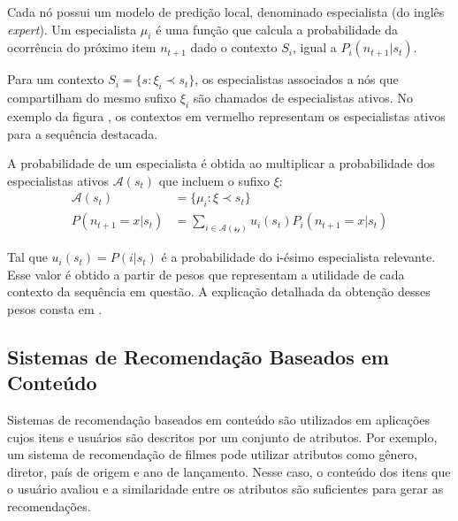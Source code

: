 Cada nó possui um modelo de predição local, denominado especialista (do inglês
\textit{expert}). Um especialista $\mu_i$ é uma função que calcula a
probabilidade da ocorrência do próximo item $n_{t+1}$ dado o contexto $S_i$, igual a
$P_i(n_{t+1} | s_t)$.

Para um contexto $S_i = \{s: \xi_i \prec s_t\}$, os especialistas associados a
nós que compartilham do mesmo sufixo $\xi_i$ são chamados de especialistas
ativos. No exemplo da figura \label{fig:context_tree}, os contextos em vermelho
representam os especialistas ativos para a sequência destacada.

A probabilidade de um especialista é obtida ao multiplicar a probabilidade dos
especialistas ativos $\mathcal{A}(s_t)$
 que incluem o sufixo $\xi$:
\begin{align}
    \mathcal{A}(s_t) &= \{\mu_i : \xi \prec s_t\}\\
    P(n_{t+1} = x | s_t) &= \sum_{i \in \mathcal{A(s_t)}} u_i(s_t)  P_i(n_{t+1} = x | s_t)
\end{align}

Tal que $u_i (s_t) = P(i|s_t)$ é a probabilidade do i-ésimo especialista
relevante. Esse valor é obtido a partir de pesos que representam a utilidade de
cada contexto da sequência em questão. A explicação detalhada da obtenção
desses pesos consta em \citet{mi2018context}.















\subsection{Sistemas de Recomendação Baseados em Conteúdo}

Sistemas de recomendação baseados em conteúdo são utilizados em aplicações cujos
itens e usuários são descritos por um conjunto de atributos. Por exemplo, um
sistema de recomendação de filmes pode utilizar atributos como gênero, diretor,
país de origem e ano de lançamento. Nesse caso, o conteúdo dos itens que o
usuário avaliou e a similaridade entre os atributos são
suficientes para gerar as recomendações.

